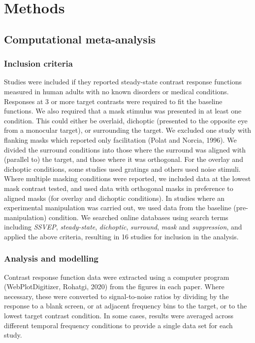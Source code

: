 \documentclass[]{article}
\begin{document}
\hypertarget{methods}{%
\section{Methods}\label{methods}}

\hypertarget{computational-meta-analysis}{%
\subsection{Computational meta-analysis}\label{computational-meta-analysis}}

\hypertarget{inclusion-criteria}{%
\subsubsection{Inclusion criteria}\label{inclusion-criteria}}

Studies were included if they reported steady-state contrast response functions measured in human adults with no known disorders or medical conditions. Responses at 3 or more target contrasts were required to fit the baseline functions. We also required that a mask stimulus was presented in at least one condition. This could either be overlaid, dichoptic (presented to the opposite eye from a monocular target), or surrounding the target. We excluded one study with flanking masks which reported only facilitation (Polat and Norcia, 1996). We divided the surround conditions into those where the surround was aligned with (parallel to) the target, and those where it was orthogonal. For the overlay and dichoptic conditions, some studies used gratings and others used noise stimuli. Where multiple masking conditions were reported, we included data at the lowest mask contrast tested, and used data with orthogonal masks in preference to aligned masks (for overlay and dichoptic conditions). In studies where an experimental manipulation was carried out, we used data from the baseline (pre-manipulation) condition. We searched online databases using search terms including \emph{SSVEP}, \emph{steady-state}, \emph{dichoptic}, \emph{surround}, \emph{mask} and \emph{suppression}, and applied the above criteria, resulting in 16 studies for inclusion in the analysis.

\hypertarget{analysis-and-modelling}{%
\subsubsection{Analysis and modelling}\label{analysis-and-modelling}}

Contrast response function data were extracted using a computer program (WebPlotDigitizer, Rohatgi, 2020) from the figures in each paper. Where necessary, these were converted to signal-to-noise ratios by dividing by the response to a blank screen, or at adjacent frequency bins to the target, or to the lowest target contrast condition. In some cases, results were averaged across different temporal frequency conditions to provide a single data set for each study.
\end{document}
